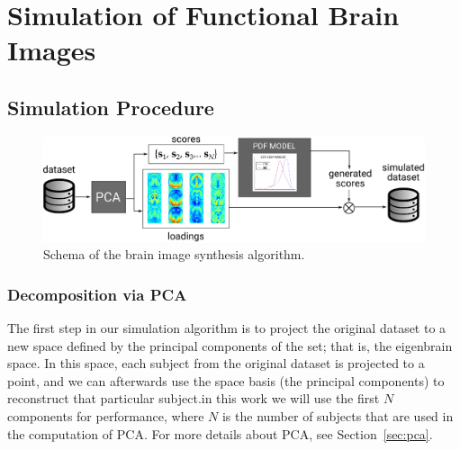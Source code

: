 \chapter{Simulation of Functional Brain Images}\label{ch:simulation}
\section{Simulation Procedure}

\begin{figure}[htp]
	\centering
	\includegraphics[width=\textwidth]{gfx/ch9/SchemaGeneration}
	\caption{Schema of the brain image synthesis algorithm.}
	\label{fig:simulationSchema}
\end{figure}
\subsection{Decomposition via PCA}
The first step in our simulation algorithm is to project the original dataset to a new space defined by the principal components of the set; that is, the eigenbrain space. In this space, each subject from the original dataset is projected to a point, and we can afterwards use the space basis (the principal components) to reconstruct that particular subject.in this work we will use the first $N$ components for performance, where $N$ is the number of subjects that are used in the computation of \ac{PCA}. For more details about \ac{PCA}, see Section~\ref{sec:pca}. 

